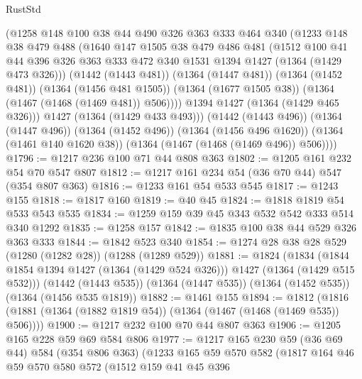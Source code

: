 \begin{lexlean}{RustStd}
\begin{coremodule}
          (@1258
            @148
            @100
            @38
            @44
            @490
            @326
            @363
            @333
            @464
            @340
            (@1233
              @148
              @38
              @479
              @488
              (@1640
                @147
                @1505
                @38
                @479
                @486
                @481
                (@1512
                  @100
                  @41
                  @44
                  @396
                  @326
                  @363
                  @333
                  @472
                  @340
                  @1531
                  @1394
                  @1427
                  (@1364 (@1429 @473 @326)))
                (@1442 (@1443 @481))
                (@1364 (@1447 @481))
                (@1364 (@1452 @481))
                (@1364 (@1456 @481 @1505))
                (@1364 (@1677 @1505 @38))
                (@1364 (@1467 (@1468 (@1469 @481)) @506))))
            @1394
            @1427
            (@1364 (@1429 @465 @326)))
          @1427
          (@1364 (@1429 @433 @493)))
        (@1442 (@1443 @496))
        (@1364 (@1447 @496))
        (@1364 (@1452 @496))
        (@1364 (@1456 @496 @1620))
        (@1364 (@1461 @140 @1620 @38))
        (@1364 (@1467 (@1468 (@1469 @496)) @506))))
@1796 := @1217 @236 @100 @71 @44 @808 @363
@1802 := @1205 @161 @232 @54 @70 @547 @807
@1812 := @1217 @161 @234 @54 (@36 @70 @44) @547 (@354 @807 @363)
@1816 := @1233 @161 @54 @533 @545
@1817 := @1243 @155
@1818 := @1817 @160
@1819 := @40 @45
@1824 := @1818 @1819 @54 @533 @543 @535
@1834 := @1259 @159 @39 @45 @343 @532 @542 @333 @514 @340 @1292
@1835 := @1258 @157
@1842 := @1835 @100 @38 @44 @529 @326 @363 @333
@1844 := @1842 @523 @340
@1854 := @1274 @28 @38 @28 @529 (@1280 (@1282 @28)) (@1288 (@1289 @529))
@1881 := @1824
    (@1834 (@1844 @1854 @1394 @1427 (@1364 (@1429 @524 @326))) @1427 (@1364 (@1429 @515 @532)))
    (@1442 (@1443 @535))
    (@1364 (@1447 @535))
    (@1364 (@1452 @535))
    (@1364 (@1456 @535 @1819))
@1882 := @1461 @155
@1894 := @1812 (@1816 (@1881 (@1364 (@1882 @1819 @54)) (@1364 (@1467 (@1468 (@1469 @535)) @506))))
@1900 := @1217 @232 @100 @70 @44 @807 @363
@1906 := @1205 @165 @228 @59 @69 @584 @806
@1977 := @1217
    @165
    @230
    @59
    (@36 @69 @44)
    @584
    (@354 @806 @363)
    (@1233
      @165
      @59
      @570
      @582
      (@1817
        @164
        @46
        @59
        @570
        @580
        @572
        (@1512
          @159
          @41
          @45
          @396

\end{coremodule}
\end{lexlean}
